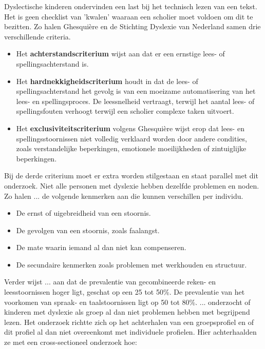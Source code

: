Dyslectische kinderen ondervinden een last bij het technisch lezen van een tekst. Het is geen checklist van 'kwalen' waaraan een scholier moet voldoen om dit te bezitten. Zo halen Ghesquière en de Stichting Dyslexie van Nederland samen drie verschillende criteria.

\begin{itemize}
	\item Het \textbf{achterstandscriterium} wijst aan dat er een ernstige lees- of spellingsachterstand is. 
	\item Het \textbf{hardnekkigheidscriterium} houdt in dat de lees- of spellingsachterstand het gevolg is van een moeizame automatisering van het lees- en spellingsproces. De leessnelheid vertraagt, terwijl het aantal lees- of spellingsfouten verhoogt terwijl een scholier complexe taken uitvoert.
	\item Het \textbf{exclusiviteitscriterium} volgens Ghesquière wijst erop dat lees- en spellingsstoornissen niet volledig verklaard worden door andere condities, zoals verstandelijke beperkingen, emotionele moeilijkheden of zintuiglijke beperkingen.
\end{itemize}


Bij de derde criterium moet er extra worden stilgestaan en staat parallel met dit onderzoek. Niet alle personen met dyslexie hebben dezelfde problemen en noden. Zo halen ... de volgende kenmerken aan die kunnen verschillen per individu.

\begin{itemize}
	\item De ernst of uigebreidheid van een stoornis.
	\item De gevolgen van een stoornis, zoals faalangst.
	\item De mate waarin iemand al dan niet kan compenseren.
	\item De secundaire kenmerken zoals problemen met werkhouden en structuur.
\end{itemize}


Verder wijst ... aan dat de prevalentie van gecombineerde reken- en leesstoornissen hoger ligt, geschat op een 25 tot 50\%. De prevalentie van het voorkomen van spraak- en taalstoornissen ligt op 50 tot 80\%. ... onderzocht of kinderen met dyslexie als groep al dan niet problemen hebben met begrijpend lezen. Het onderzoek richtte zich op het achterhalen van een groepsprofiel en of dit profiel al dan niet overeenkomt met individuele profielen. Hier achterhaalden ze met een cross-sectioneel onderzoek hoe:

